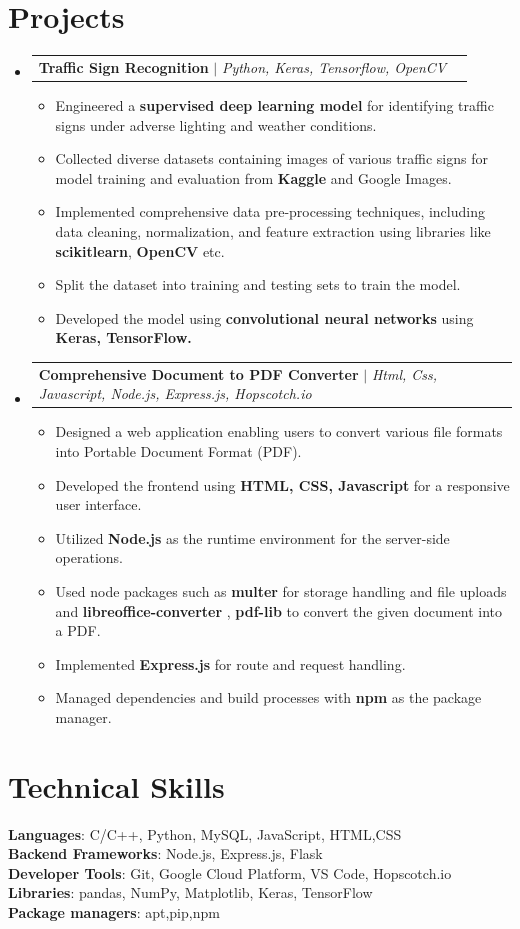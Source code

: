 \documentclass[letterpaper,11pt]{article}
\makeatletter
\newcommand{\resumeItem}[1]{
  \item\small{
    {#1 \vspace{-2pt}}
  }
}
\newcommand{\resumeProjectHeading}[2]{
    \item
    \begin{tabular*}{0.97\textwidth}{l@{\extracolsep{\fill}}r}
      \small#1 & #2 \\
    \end{tabular*}\vspace{-7pt}
}
\newcommand{\resumeSubHeadingListStart}{\begin{itemize}[leftmargin=0.15in, label={}]}
\newcommand{\resumeSubHeadingListEnd}{\end{itemize}}
\newcommand{\resumeItemListStart}{\begin{itemize}}
\newcommand{\resumeItemListEnd}{\end{itemize}\vspace{-5pt}}
\makeatother
\begin{document}
\section{Projects}
    \resumeSubHeadingListStart
      \resumeProjectHeading
          {\textbf{Traffic Sign Recognition} $|$ \emph{Python, Keras, Tensorflow, OpenCV}}{}
        \resumeItemListStart
            \resumeItem{Engineered a \textbf{supervised deep learning model} for identifying traffic signs under adverse lighting and weather conditions.}
            \resumeItem{Collected diverse datasets containing images of various traffic signs for model training and evaluation from \textbf{Kaggle} and Google Images.}
            \resumeItem{Implemented comprehensive data pre-processing techniques, including data cleaning, normalization, and feature extraction using libraries like \textbf{scikitlearn}, \textbf{OpenCV} etc.}
            \resumeItem{Split the dataset into training and testing sets to train the model.}
            \resumeItem{Developed the model using \textbf{convolutional neural networks} using \textbf{Keras, TensorFlow.}}
        \resumeItemListEnd
      \resumeProjectHeading
          {\textbf{Comprehensive Document to PDF Converter} $|$ \emph{Html, Css, Javascript, Node.js, Express.js, Hopscotch.io}}{}
          \resumeItemListStart
            \resumeItem{Designed a web application enabling users to convert various file formats into Portable Document Format (PDF).}
            \resumeItem{Developed the frontend using \textbf{HTML, CSS, Javascript} for a responsive user interface.}
            \resumeItem{Utilized \textbf{Node.js} as the runtime environment for the server-side operations.}
            \resumeItem{Used node packages such as \textbf{multer} for storage handling and file uploads and  \textbf{libreoffice-converter} , \textbf{pdf-lib} to convert the given document into a PDF.}
            \resumeItem{Implemented \textbf{Express.js} for route and request handling.}
            \resumeItem{Managed dependencies and build processes with \textbf{npm} as the package manager.}
          \resumeItemListEnd
    \resumeSubHeadingListEnd



%
\section{Technical Skills}
 \begin{itemize}[leftmargin=0.15in, label={}]
    \small{\item{
     \textbf{Languages}{: C/C++, Python, MySQL, JavaScript, HTML,CSS} \\
     \textbf{Backend Frameworks}{: Node.js, Express.js, Flask} \\
     \textbf{Developer Tools}{: Git, Google Cloud Platform, VS Code, Hopscotch.io} \\
     \textbf{Libraries}{: pandas, NumPy, Matplotlib, Keras, TensorFlow} \\
     \textbf{Package managers}{: apt,pip,npm} 
    }}
 \end{itemize}


\end{document}
